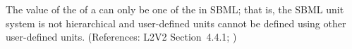 The value of the   of a \Unit can only be
one of the  in SBML; that is, the SBML unit
system is not hierarchical and user-defined units cannot be defined using
other user-defined units.  (References: L2V2 Section~4.4.1;
)
